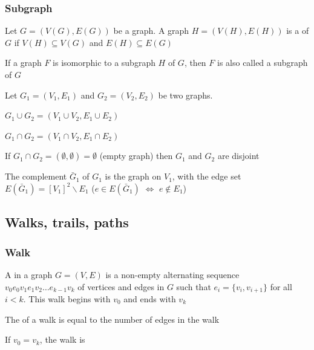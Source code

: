\documentclass[aspectratio=43]{beamer}
\begin{document}
\begin{frame}\frametitle{Subgraph}
\begin{definition}[Subgraph]
Let $G=(V(G),E(G))$ be a graph.
A graph $H=(V(H),E(H))$ is a  of $G$ if $V(H)\subseteq V(G)$ and $E(H)\subseteq E(G)$
\end{definition}
\vfill
\begin{definition}
If a graph $F$ is isomorphic to a subgraph $H$ of $G$, then $F$ is also called a subgraph of $G$
\end{definition}
\end{frame}


\begin{frame}
Let $G_1=(V_1,E_1)$ and $G_2=(V_2,E_2)$ be two graphs.
\begin{definition}
$G_1\cup G_2=(V_1\cup V_2,E_1\cup E_2)$
\end{definition}
\begin{definition}
$G_1\cap G_2=(V_1\cap V_2,E_1\cap E_2)$
\end{definition}
\begin{definition}
If $G_1\cap G_2=(\emptyset,\emptyset)= \emptyset$ (empty graph) then $G_1$ and $G_2$ are disjoint
\end{definition}
\begin{definition}[{Complement of $G_1$}]
The complement $\bar G_1$ of $G_1$ is the graph on $V_1$, with the edge set $E(\bar G_1)=[V_1]^2\backslash E_1$ ($e\in E(\bar G_1)$ $\iff$ $e\not \in E_1$)
\end{definition}
\end{frame}


\subsection{Walks, trails, paths}


\begin{frame}\frametitle{Walk}
\begin{definition}[{Walk}]
A  in a graph $G=(V,E)$ is a non-empty alternating sequence $v_0 e_0 v_1 e_1 v_2 \dots e_{k-1} v_k$ of vertices and edges in $G$ such that $e_i=\{v_i, v_{i+1}\}$ for all $i<k$. 
This walk begins with $v_0$ and ends with $v_k$
\end{definition}
\vfill
\begin{definition}
The  of a walk is equal to the number of edges in the walk
\end{definition}
\vfill
\begin{definition}
If $v_0=v_k$, the walk is 
\end{definition}
\end{frame}
\end{document}
